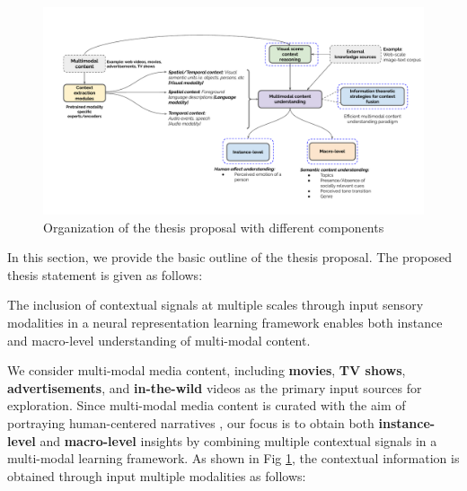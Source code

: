 \begin{figure}[h!]
    \centering
        \includegraphics[width=\textwidth]{figures/Proposal_organization.pdf}
        \caption{Organization of the thesis proposal with different components}
        \label{proposalorganization}
\end{figure}

In this section, we provide the basic outline of the thesis proposal. The proposed thesis statement is given as follows:

\begin{tcolorbox}[width=\textwidth]
The inclusion of contextual signals at multiple scales through input sensory modalities in a neural representation learning framework enables both instance and macro-level understanding of multi-modal content.
\end{tcolorbox}

We consider multi-modal media content, including \textbf{movies}, \textbf{TV shows}, \textbf{advertisements}, and \textbf{in-the-wild} videos as the primary input sources for exploration. Since multi-modal media content is curated with the aim of portraying human-centered narratives \cite{CMI}, our focus is to obtain both \textbf{instance-level} and \textbf{macro-level} insights by combining multiple contextual signals in a multi-modal learning framework. As shown in Fig \ref{proposalorganization}, the contextual information is obtained through input multiple modalities as follows:

